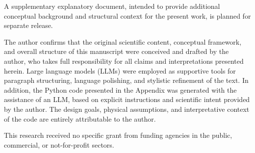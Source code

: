 \documentclass[%
 reprint,
 amsmath,amssymb,
 aps,
 prb,
]{revtex4-2}
\numberwithin{equation}{section}
\begin{document}
\smallskip

A supplementary explanatory document, intended to provide additional conceptual background and structural context for the present work, is planned for separate release.

\begin{acknowledgments}
The author confirms that the original scientific content, conceptual framework, and overall structure of this manuscript were conceived and drafted by the author, who takes full responsibility for all claims and interpretations presented herein. Large language models (LLMs) were employed as supportive tools for paragraph structuring, language polishing, and stylistic refinement of the text. In addition, the Python code presented in the Appendix was generated with the assistance of an LLM, based on explicit instructions and scientific intent provided by the author. The design goals, physical assumptions, and interpretative context of the code are entirely attributable to the author.

This research received no specific grant from funding agencies in the public, commercial, or not-for-profit sectors.
\end{acknowledgments}
\end{document}

